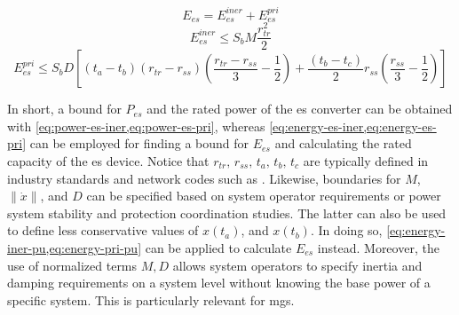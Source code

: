 \documentclass[utf8]{frontiersSCNS} %
\begin{document}

\begin{equation} \label{eq:energy-es}
E_{es} = E_{es}^{iner} + E_{es}^{pri}
\end{equation}
\begin{equation}\label{eq:energy-es-iner}
E_{es}^{iner} \le S_b M \frac{r_{tr}^{2}}{2}
\end{equation}
\begin{equation} \label{eq:energy-es-pri}
E_{es}^{pri} \le S_b D \left[  \left( t_a - t_b \right) \left( r_{tr} - r_{ss} \right) \left( \frac{r_{tr} - r_{ss}}{3} - \frac{1}{2} \right) + \frac{\left(t_b - t_c \right)}{2} r_{ss} \left( \frac{r_{ss}}{3} - \frac{1}{2}\right) \right]
\end{equation}


In short, a bound for $P_{es}$ and the rated power of the \gls{es} converter can be obtained with \cref{eq:power-es-iner,eq:power-es-pri}, whereas \cref{eq:energy-es-iner,eq:energy-es-pri} can be employed for finding a bound for $E_{es}$ and calculating the rated capacity of the \gls{es} device. Notice that $r_{tr},\,r_{ss},\,t_a,\,t_b,\,t_c$ are typically defined in industry standards and network codes such as \cite{IEEEStd154720182018,comissionregulationeuNetworkCodeRequirements2016}. Likewise, boundaries for $M$, $\lVert \dot{x} \rVert$, and $D$ can be specified based on system operator requirements or power system stability and protection coordination studies. The latter can also be used to define less conservative values of $x(t_a)$, and $x(t_b)$. In doing so, \cref{eq:energy-iner-pu,eq:energy-pri-pu} can be applied to calculate $E_{es}$ instead. Moreover, the use of normalized terms $ M, D $ allows system operators to specify inertia and damping requirements on a system level without knowing the base power of a specific system. This is particularly relevant for \glspl{mg}. 
\end{document}
